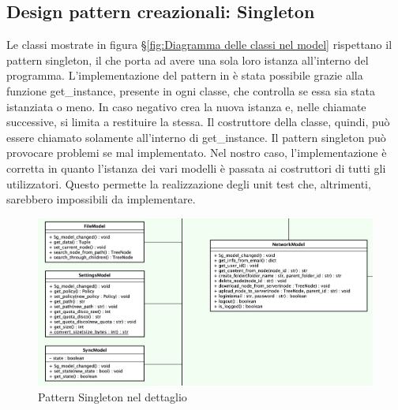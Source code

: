 \subsection{Design pattern creazionali: Singleton}

Le classi mostrate in figura \S{}\ref{fig:Diagramma delle classi nel model} rispettano il pattern singleton, il che porta ad avere una sola loro istanza all'interno del programma.
\newline{}
L'implementazione del pattern in  è stata possibile grazie alla funzione get\_instance, presente in ogni classe,  che controlla se essa sia stata istanziata o meno. In caso negativo crea la nuova istanza e, nelle chiamate successive, si limita a restituire la stessa. Il costruttore della classe, quindi, può essere chiamato solamente all'interno di get\_instance. \newline{}
Il pattern singleton può provocare problemi se mal implementato. Nel nostro caso, l'implementazione è corretta in quanto l'istanza dei vari modelli è passata ai costruttori di tutti gli utilizzatori. Questo permette la realizzazione degli unit test che, altrimenti, sarebbero impossibili da implementare. 
\begin{figure}[H]
    \centering
    \includegraphics[scale = 0.43]{components/img/singleton-model.png}
    \caption{Pattern Singleton nel dettaglio}
    \label{fig:Diagramma del pattern singleton}
\end{figure}
